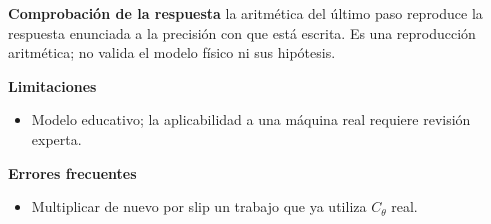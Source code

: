 \documentclass[10pt,openany]{book}
\begin{document}
\begin{tcolorbox}[title={Problema resuelto 1}, studiumworked, breakable]
\noindent\textbf{Comprobación de la respuesta} la aritmética del último paso reproduce la respuesta enunciada a la precisión con que está escrita. Es una reproducción aritmética; no valida el modelo físico ni sus hipótesis.

\noindent\textbf{Limitaciones}
\begin{itemize}
\item Modelo educativo; la aplicabilidad a una máquina real requiere revisión experta.
\end{itemize}

\noindent\textbf{Errores frecuentes}
\begin{itemize}
\item Multiplicar de nuevo por slip un trabajo que ya utiliza $C_\theta$ real.
\end{itemize}
\end{tcolorbox}
\end{document}
